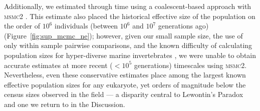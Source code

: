 Additionally, we estimated \Ne{} through time using a coalescent-based
approach with \textsc{msmc2} \citep{dutheil_msmc_2020}. This estimate also placed
the historical effective size of the population on the order of $10^{6}$ individuals
(between $10^{6}$ and $10^{7}$ generations ago) (Figure~\ref{fig:sup_mcmc_ne});
however, given our small sample size, the use of only within sample pairwise
comparisons, and the known difficulty of calculating population sizes for hyper-diverse
marine invertebrates , we were unable to obtain accurate \Ne{} estimates at more
recent ($<10^{5}$ generations) timescales using \textsc{msmc2}.
Nevertheless, even these conservative estimates place \bgla{} among the
largest known effective population sizes for any eukaryote, yet orders of
magnitude below the census sizes observed in the field --- a disparity
central to Lewontin's Paradox and one we return to in the Discussion.
